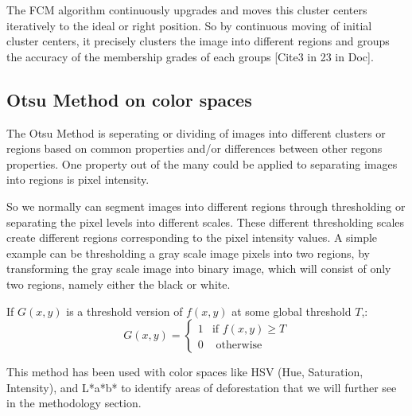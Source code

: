 \documentclass[12pt,a4paper,IEEEtran]{article}
\begin{document}
The FCM algorithm continuously upgrades and moves this cluster centers iteratively to the ideal or right position. So by continuous moving of initial cluster centers, it precisely clusters the image into different regions and groups the accuracy of the membership grades of each groups [Cite3 in 23 in Doc]. 


\subsection[3.2]{Otsu Method on color spaces}
The Otsu Method \cite{5254345} is seperating or dividing of images into different clusters or regions based on common properties and/or differences between other regons properties. One property out of the many could be applied to separating images into regions is pixel intensity. 

So we normally can segment images into different regions through thresholding or separating the pixel levels into different scales. These different thresholding scales create different regions corresponding to the pixel intensity values. 
\newline A simple example can be thresholding a gray scale image pixels into two regions, by transforming the gray scale image into binary image, which will consist of only two regions, namely either the black or white.

If $G(x,y)$ is a threshold version of $f(x,y)$ at some global threshold $T$,:
\[G(x,y) =
\begin{cases}
1 & \text{if } f(x,y) \geq T\\
0 & \text{ otherwise}
\end{cases}
\]

This method has been used with color spaces like HSV (Hue, Saturation, Intensity), and L*a*b* to identify areas of deforestation that we will further see in the methodology section.




\end{document}
